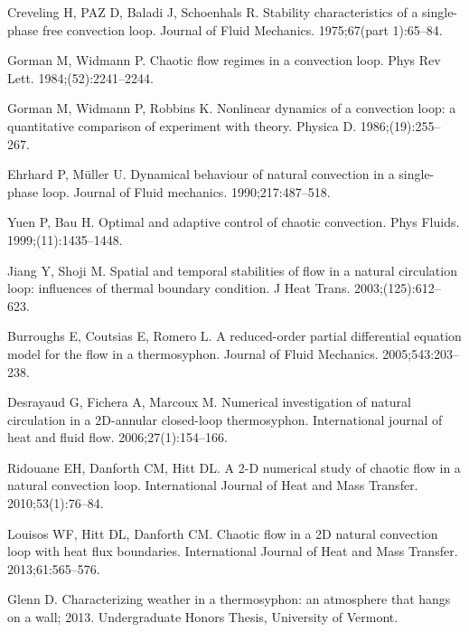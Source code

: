 \documentclass[10pt,letterpaper]{article}
\begin{document}
\begin{thebibliography}{10}
Creveling H, PAZ D, Baladi J, Schoenhals R.
\newblock Stability characteristics of a single-phase free convection loop.
\newblock Journal of Fluid Mechanics. 1975;67(part 1):65--84.

Gorman M, Widmann P.
\newblock Chaotic flow regimes in a convection loop.
\newblock Phys Rev Lett. 1984;(52):2241--2244.

Gorman M, Widmann P, Robbins K.
\newblock Nonlinear dynamics of a convection loop: a quantitative comparison of
  experiment with theory.
\newblock Physica D. 1986;(19):255--267.

Ehrhard P, M{\"u}ller U.
\newblock Dynamical behaviour of natural convection in a single-phase loop.
\newblock Journal of Fluid mechanics. 1990;217:487--518.

Yuen P, Bau H.
\newblock Optimal and adaptive control of chaotic convection.
\newblock Phys Fluids. 1999;(11):1435--1448.

Jiang Y, Shoji M.
\newblock Spatial and temporal stabilities of flow in a natural circulation
  loop: influences of thermal boundary condition.
\newblock J Heat Trans. 2003;(125):612--623.

Burroughs E, Coutsias E, Romero L.
\newblock A reduced-order partial differential equation model for the flow in a
  thermosyphon.
\newblock Journal of Fluid Mechanics. 2005;543:203--238.

Desrayaud G, Fichera A, Marcoux M.
\newblock Numerical investigation of natural circulation in a 2D-annular
  closed-loop thermosyphon.
\newblock International journal of heat and fluid flow. 2006;27(1):154--166.

Ridouane EH, Danforth CM, Hitt DL.
\newblock A 2-D numerical study of chaotic flow in a natural convection loop.
\newblock International Journal of Heat and Mass Transfer. 2010;53(1):76--84.

Louisos WF, Hitt DL, Danforth CM.
\newblock Chaotic flow in a 2D natural convection loop with heat flux
  boundaries.
\newblock International Journal of Heat and Mass Transfer. 2013;61:565--576.

Glenn D.
\newblock Characterizing weather in a thermosyphon: an atmosphere that hangs on
  a wall; 2013.
\newblock Undergraduate Honors Thesis, University of Vermont.


\end{thebibliography}
\end{document}
